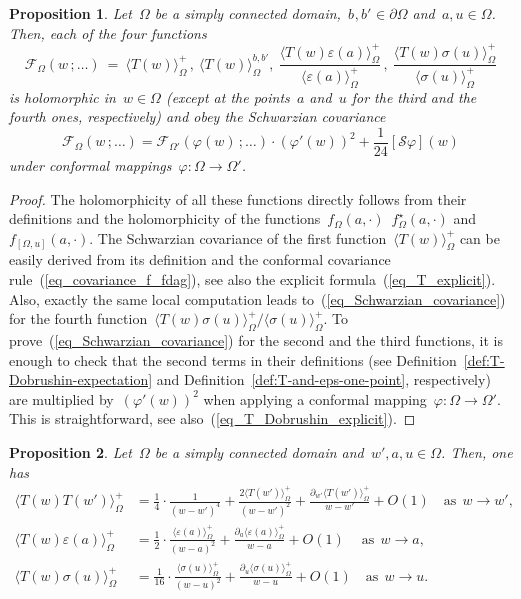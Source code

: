 \documentclass[reqno,11pt,a4paper]{amsart}
\newtheorem{proposition}{Proposition}[section]
\theoremstyle{remark}
\newcommand{\schw}{\mathcal{S}}
\newcommand{\dob}{{b,b'}}
\newcommand{\OmegaU}{{[\Omega,u]}}
\newcommand{\f}{f_{\Omega}}
\newcommand{\fstar}{f_{\Omega}^\star}
\newcommand{\fU}{f_\OmegaU}
\newcommand\Corr[1]{\langle #1 \rangle}
\newcommand\CorrO[2][+]{\Corr{#2}_\Omega^{#1}}
\begin{document}
\begin{proposition}
\label{prop:Schwarzian-covariance} Let~$\Omega$ be a simply connected domain,~$b_{},b'_{}\in\partial\Omega$ and~$a,u\in\Omega$. Then, each of the four functions
\[
\mathcal{F}_\Omega(w\,;\dots)~=~\CorrO{T(w)}\,,~\CorrO[\dob]{T(w)},~\frac{\CorrO{T(w)\varepsilon(a)}}{\CorrO{\varepsilon(a)}}\,,~ \frac{\CorrO{T(w)\sigma(u)}}{\CorrO{\sigma(u)}}
\]
is holomorphic in~$w\in\Omega$ (except at the points~$a$ and~$u$ for the third and the fourth ones, respectively) and obey the Schwarzian covariance
\begin{equation}
\label{eq_Schwarzian_covariance}
\mathcal{F}_\Omega(w\,;\dots)= \mathcal{F}_{\Omega'}(\varphi(w)\,;\dots)\cdot (\varphi'(w))^2+ {\textstyle\frac{1}{24}}[\schw\varphi](w)
\end{equation}
under conformal mappings~$\varphi:\Omega\to\Omega'$.
\end{proposition}

\begin{proof} The holomorphicity of all these functions directly follows from their definitions and the holomorphicity of the functions~$\f(a,\cdot)$~$\fstar(a,\cdot)$ and~$\fU(a,\cdot)$. The Schwarzian covariance of the first function~$\CorrO{T(w)}$ can be easily derived from its definition and the conformal covariance rule~(\ref{eq_covariance_f_fdag}), see also the explicit formula~(\ref{eq_T_explicit}). Also, exactly the same local computation leads to~(\ref{eq_Schwarzian_covariance}) for the fourth function~$\CorrO{T(w)\sigma(u)}/\CorrO{\sigma(u)}$. To prove~(\ref{eq_Schwarzian_covariance}) for the second and the third functions, it is enough to check that the second terms in their definitions (see Definition~\ref{def:T-Dobrushin-expectation} and Definition~\ref{def:T-and-eps-one-point}, respectively) are multiplied by~$(\varphi'(w))^2$ when applying a conformal mapping~$\varphi:\Omega\to\Omega'$. This is straightforward, see also~(\ref{eq_T_Dobrushin_explicit}).
\end{proof}

\begin{proposition} \label{prop:OPE} Let~$\Omega$ be a simply connected domain and~$w',a,u\in\Omega$. Then, one has
\begin{align}
 \label{eq_OPE_TT} \langle T(w)T(w')\rangle_\Omega^+ &=
 \frac{1}{4}\cdot\frac{1}{(w-w')^4}+\frac{2\langle T(w')\rangle_\Omega^+}{(w-w')^2}
 +\frac{\partial_{w'} \langle T(w')\rangle_\Omega^+}{w-w'} + O(1)\quad\text{as}\ \ w\to w',\\
 \label{eq_OPE_Te} \langle T(w) \varepsilon(a)\rangle_\Omega^+ &=
 \frac{1}{2}\cdot\frac{\langle \varepsilon(a)\rangle_\Omega^+}{(w-a)^2}
 +\frac{\partial_a \langle \varepsilon(a)\rangle_\Omega^+}{w-a}+ O(1)\quad \ \text{as}\ \ w\to a,\\
 \label{eq_OPE_Ts} \langle T(w) \sigma(u)\rangle_\Omega^+ &=
  \frac{1}{16}\cdot \frac{\langle \sigma(u)\rangle_\Omega^+}{(w-u)^{2}}
  +\frac{\partial_u\langle \sigma(u)\rangle_\Omega^+}{w-u}+ O(1)\quad \text{as}\ \ w\to u.
\end{align}
\end{proposition}
\end{document}
